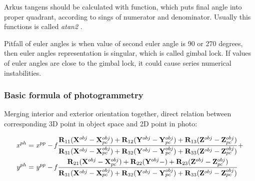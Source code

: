 \documentclass[a4paper,12pt]{article}
\newcommand{\ematr}[1]{
{\bf #1}
}
\newcommand{\evect}[1]{
{\bf #1}
}
\newcommand{\escal}[1]{
{\it #1}
}
\newcommand{\term}[1]{
{\it #1}
}
\begin{document}
Arkus tangens should be calculated with function, which puts final angle into proper quadrant, according to sings of numerator 
and denominator. Usually this functions is called \term{atan2}. 

Pitfall of euler angles is when value of second euler angle is 90 or 270 degrees,  
then euler angles representation is singular, which is called gimbal lock. 
If values  of euler angles are close to the gimbal lock, it could cause series numerical instabilities.

\subsubsection{Basic formula of photogrammetry}

Merging interior and exterior orientation together, direct relation between corresponding 3D point in object space and 2D point
in photo:

\begin{equation}
\label{eq:col_eqs}
\begin{split}
&\escal{x}^{ph} = \escal{x}^{pp} -\escal{f}\frac{\ematr{R}_{11}(\evect{X}^{obj} - \evect{X}^{obj}_{pc}) + 
                                  \ematr{R}_{12}(\evect{Y}^{obj} - \evect{Y}^{obj}_{pc}) + 
                                  \ematr{R}_{13}(\evect{Z}^{obj} - \evect{Z}^{obj}_{pc})                                  
                                  }{
				  \ematr{R}_{31}(\evect{X}^{obj} - \evect{X}^{obj}_{pc}) + 
                                  \ematr{R}_{32}(\evect{Y}^{obj} - \evect{Y}^{obj}_{pc}) + 
                                  \ematr{R}_{33}(\evect{Z}^{obj} - \evect{Z}^{obj}_{pc})     
                                  } +  \\
&\escal{y}^{ph} = \escal{y}^{pp} -\escal{f}\frac{\ematr{R}_{21}(\evect{X}^{obj} - \evect{X}^{obj}_{pc}) + 
                                  \ematr{R}_{22}(\evect{Y}^{obj} - ) + 
                                  \ematr{R}_{23}(\evect{Z}^{obj} - \evect{Z}^{obj}_{pc})                                  
                                  }{
				  \ematr{R}_{31}(\evect{X}^{obj} - \evect{X}^{obj}_{pc}) + 
                                  \ematr{R}_{32}(\evect{Y}^{obj} - \evect{Y}^{obj}_{pc}) + 
                                  \ematr{R}_{33}(\evect{Z}^{obj} - \evect{Z}^{obj}_{pc})     
                                  }
\end{split}
\end{equation}
\end{document}
